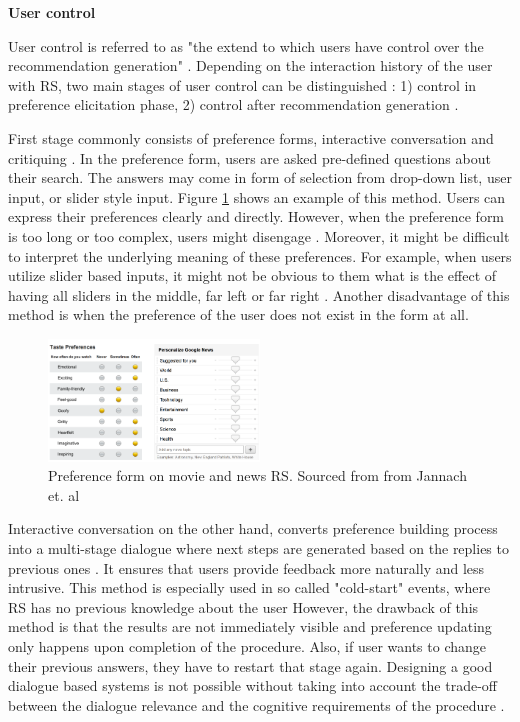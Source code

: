 \documentclass[a4paper,12pt]{article}
\newcommand{\citeyearonly}[1]{\citeyearpar{#1}}
\begin{document}
\textbf{User control}

User control is referred to as "the extend to which users have control over the recommendation generation" \citep{knijnenburgExplainingUserExperience2012}. Depending on the interaction history of the user with RS, two main stages of user control can be distinguished : 1) control in preference elicitation phase, 2) control after recommendation generation \citep{jannach2017user}.

First stage commonly consists of preference forms, interactive conversation and critiquing \citep{jannach2019explanations}. In the preference form, users are asked pre-defined questions about their search. The answers may come in form of selection from drop-down list, user input, or slider style input. Figure \ref{fig:preference} shows an example of this method. Users can express their preferences clearly and directly.  However, when the preference form is too long or too complex, users might disengage \citep{jannach2017user}. Moreover, it might be difficult to interpret the underlying meaning of these preferences. For example, when users utilize slider based inputs, it might not be obvious to them what is the effect of having all sliders in the middle, far left or far right \citep{jannach2017user}. Another disadvantage of this method is when the preference of the user does not exist in the form at all.

\begin{figure}[H]
    \centering
    \includegraphics[width=0.5\textwidth]{staticFiles/preferenceForm.png}
    \caption{Preference form on movie and news RS. Sourced from from Jannach et. al \citeyearonly{jannach2017user}}
    \label{fig:preference}
\end{figure}

Interactive conversation on the other hand, converts preference building process into a multi-stage dialogue where next steps are generated based on the replies to previous ones \citep{he2016interactive}. It ensures that users provide feedback more naturally and less intrusive. This method is especially used in so called "cold-start" events, where RS has no previous knowledge about the user \citep{guAddressingColdStartProblem2019} However, the drawback of this method is that the results are not immediately visible and preference updating only happens upon completion of the procedure. Also, if user wants to change their previous answers, they have to restart that stage again. Designing a good dialogue based systems is not possible without taking into account the trade-off between the dialogue relevance and the cognitive requirements of the procedure \citep{Gao_2021}. 
\end{document}
